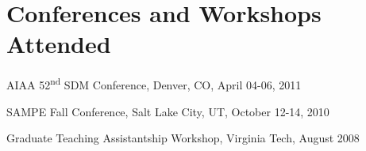 \documentclass[10pt,letterpaper]{article}
\renewenvironment{itemize}{
  \begin{list}{}{
    \setlength{\leftmargin}{1.5em}
    \setlength{\itemsep}{0.25em}
    \setlength{\parskip}{0pt}
    \setlength{\parsep}{0.25em}
  }
}{
  \end{list}
}
\begin{document}
\section*{Conferences and Workshops Attended}

\begin{itemize}
\item AIAA 52\textsuperscript{nd} SDM Conference, Denver, CO, April 04-06, 2011
\item SAMPE Fall Conference, Salt Lake City, UT, October 12-14, 2010
\item Graduate Teaching Assistantship Workshop, Virginia Tech, August 2008
\end{itemize}
\end{document}
